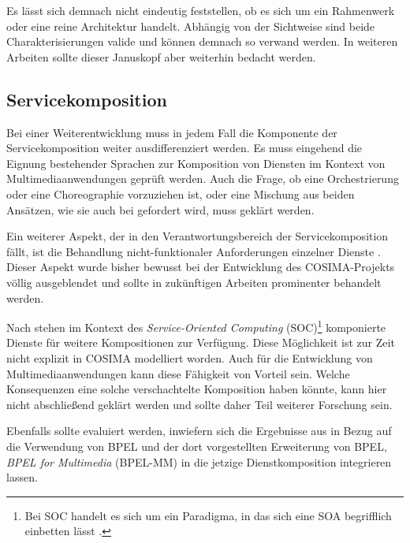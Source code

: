   Es lässt sich demnach nicht eindeutig feststellen, ob es sich um ein Rahmenwerk oder eine reine Architektur handelt. Abhängig von der Sichtweise sind beide Charakterisierungen valide und können demnach so verwand werden. In weiteren Arbeiten sollte dieser Januskopf aber weiterhin bedacht werden.


\subsection{Servicekomposition} %
\label{sub:servicekomposition_fragen}

  Bei einer Weiterentwicklung muss in jedem Fall die Komponente der Servicekomposition weiter ausdifferenziert werden. Es muss eingehend die Eignung bestehender Sprachen zur Komposition von Diensten im Kontext von Multimediaanwendungen geprüft werden. Auch die Frage, ob eine Orchestrierung oder eine Choreographie vorzuziehen ist, oder eine Mischung aus beiden Ansätzen, wie sie auch bei \citep{papazoglou2007soc} gefordert wird, muss geklärt werden.
  
  Ein weiterer Aspekt, der in den Verantwortungsbereich der Servicekomposition fällt, ist die Behandlung nicht-funktionaler Anforderungen einzelner Dienste \citep[S. 42]{papazoglou2007soc}. Dieser Aspekt wurde bisher bewusst bei der Entwicklung des COSIMA-Projekts völlig ausgeblendet und sollte in zukünftigen Arbeiten prominenter behandelt werden.

  Nach \citep[S. 8]{service_oriented_computing} stehen im Kontext des \emph{Service-Oriented Computing} (SOC)\footnote{Bei SOC handelt es sich um ein Paradigma, in das sich eine SOA begrifflich einbetten lässt \citep[S. 8]{soa_goes_real}.} komponierte Dienste für weitere Kompositionen zur Verfügung. Diese Möglichkeit ist zur Zeit nicht explizit in COSIMA modelliert worden. Auch für die Entwicklung von Multimediaanwendungen kann diese Fähigkeit von Vorteil sein. Welche Konsequenzen eine solche verschachtelte Komposition haben könnte, kann hier nicht abschließend geklärt werden und sollte daher Teil weiterer Forschung sein.
  
  Ebenfalls sollte evaluiert werden, inwiefern sich die Ergebnisse aus \citep{samma08} in Bezug auf die Verwendung von BPEL und der dort vorgestellten Erweiterung von BPEL, \emph{BPEL for Multimedia} (BPEL-MM) in die jetzige Dienstkomposition integrieren lassen.

